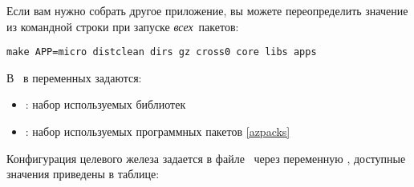 
Если вам нужно собрать другое приложение, вы можете переопределить значение из
командной строки при запуске \emph{всех}\ пакетов:

\begin{verbatim}
make APP=micro distclean dirs gz cross0 core libs apps
\end{verbatim}

В \ в переменных задаются:

\begin{itemize}
  \item {}: набор используемых библиотек
  \item {}: набор используемых программных пакетов \ref{azpacks}
\end{itemize}



\label{azhw}

Конфигурация целевого железа задается в файле \ через
переменную , доступные значения приведены в таблице:

